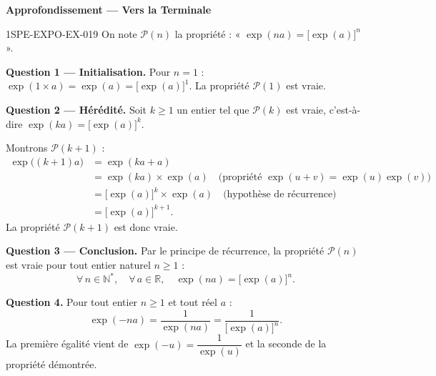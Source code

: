 \begin{center}\textbf{Approfondissement — Vers la Terminale}\end{center}
\begin{corrige}{1SPE-EXPO-EX-019}
On note $\mathcal{P}(n)$ la propriété : « $\exp(na) = \bigl[\exp(a)\bigr]^n$ ».

\textbf{Question 1 — Initialisation.} Pour $n = 1$ : $\exp(1 \times a) = \exp(a) = \bigl[\exp(a)\bigr]^1$. La propriété $\mathcal{P}(1)$ est vraie.

\textbf{Question 2 — Hérédité.} Soit $k \geqslant 1$ un entier tel que $\mathcal{P}(k)$ est vraie, c'est-à-dire $\exp(ka) = \bigl[\exp(a)\bigr]^k$.

Montrons $\mathcal{P}(k+1)$ :
\begin{align*}
\exp\bigl((k+1)a\bigr) &= \exp(ka + a) \\
  &= \exp(ka) \times \exp(a) \quad \text{(propriété $\exp(u+v) = \exp(u)\exp(v)$)} \\
  &= \bigl[\exp(a)\bigr]^k \times \exp(a) \quad \text{(hypothèse de récurrence)} \\
  &= \bigl[\exp(a)\bigr]^{k+1}.
\end{align*}
La propriété $\mathcal{P}(k+1)$ est donc vraie.

\textbf{Question 3 — Conclusion.} Par le principe de récurrence, la propriété $\mathcal{P}(n)$ est vraie pour tout entier naturel $n \geqslant 1$ :
\[
\forall\, n \in \mathbb{N}^*,\quad \forall\, a \in \mathbb{R},\quad \exp(na) = \bigl[\exp(a)\bigr]^n.
\]

\textbf{Question 4.} Pour tout entier $n \geqslant 1$ et tout réel $a$ :
\[
\exp(-na) = \frac{1}{\exp(na)} = \frac{1}{\bigl[\exp(a)\bigr]^n}.
\]
La première égalité vient de $\exp(-u) = \dfrac{1}{\exp(u)}$ et la seconde de la propriété démontrée.
\end{corrige}
